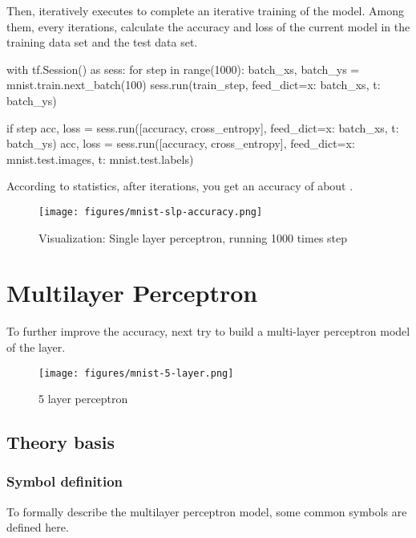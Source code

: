 \begin{content}
\begin{content}
Then, iteratively executes  to complete an iterative training of the model. Among them, every  iterations, calculate the accuracy and loss of the current model in the training data set and the test data set.

\begin{leftbar}
\begin{python}
with tf.Session() as sess:
  for step in range(1000):
    batch_xs, batch_ys = mnist.train.next_batch(100)        
    sess.run(train_step, feed_dict={x: batch_xs, t: batch_ys})
    
    if step %
      acc, loss = sess.run([accuracy, cross_entropy], 
        feed_dict={x: batch_xs, t: batch_ys})
      acc, loss = sess.run([accuracy, cross_entropy], 
        feed_dict={x: mnist.test.images, t: mnist.test.labels}) 
\end{python}
\end{leftbar}

According to statistics, after  iterations, you get an accuracy of about .

\begin{figure}[H]
  \centering
  \texttt{[image: figures/mnist-slp-accuracy.png]}
  \caption{Visualization: Single layer perceptron, running 1000 times step}
  \label{fig:mnist-slp-accuracy}
\end{figure}

\end{content}


\section{Multilayer Perceptron}
\begin{content}
To further improve the accuracy, next try to build a multi-layer perceptron model of the  layer.

\begin{figure}[H]
  \centering
  \texttt{[image: figures/mnist-5-layer.png]}
  \caption{5 layer perceptron}
  \label{fig:mnist-5-layer}
\end{figure}


\subsection{Theory basis}

\subsubsection{Symbol definition}
To formally describe the multilayer perceptron model, some common symbols are defined here.


\end{content}
\end{content}

